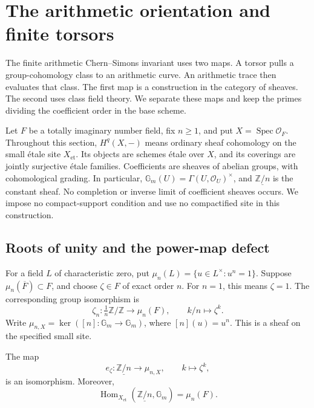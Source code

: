 \section{The arithmetic orientation and finite torsors}
\label{sec:do26-orientation}

The finite arithmetic Chern--Simons invariant uses two maps.  A torsor
pulls a group-cohomology class to an arithmetic curve.  An arithmetic trace
then evaluates that class.  The first map is a construction in the category
of sheaves.  The second uses class field theory.  We separate these maps
and keep the primes dividing the coefficient order in the base scheme.

Let \(F\) be a totally imaginary number field, fix \(n\geq1\),
and put \(X=\operatorname{Spec}\mathcal O_F\).  Throughout this section,
\(H^q(X,-)\) means ordinary sheaf cohomology on the small \'etale site
\(X_{\mathrm{et}}\).  Its objects are schemes \'etale over \(X\), and
its coverings are jointly surjective \'etale families.  Coefficients are
sheaves of abelian groups, with cohomological grading.  In particular,
\(\mathbb G_m(U)=\Gamma(U,\mathcal O_U)^\times\), and
\(\underline{\mathbb Z/n}\) is the constant sheaf.  No completion or
inverse limit of coefficient sheaves occurs.  We impose no compact-support
condition and use no compactified site in this construction.

\subsection{Roots of unity and the power-map defect}

For a field \(L\) of characteristic zero, put
\(\mu_n(L)=\{u\in L^\times:u^n=1\}\).
Suppose \(\mu_n(\overline F)\subset F\), and choose
\(\zeta\in F\) of exact order \(n\).  For \(n=1\), this means
\(\zeta=1\).  The corresponding group isomorphism is
\[
 \zeta_n:\tfrac1n\mathbb Z/\mathbb Z\longrightarrow\mu_n(F),
 \qquad k/n\longmapsto\zeta^k.
\]
Write \(\mu_{n,X}=\ker([n]:\mathbb G_m\to\mathbb G_m)\), where
\([n](u)=u^n\).  This is a sheaf on the specified small site.

\begin{lemma}
\label{lem:do26-roots}
The map
\[
 e_\zeta:\underline{\mathbb Z/n}\longrightarrow\mu_{n,X},
 \qquad k\longmapsto\zeta^k,
\]
is an isomorphism.  Moreover,
\[
 \operatorname{Hom}_{X_{\mathrm{et}}}
   (\underline{\mathbb Z/n},\mathbb G_m)=\mu_n(F).
\]
\end{lemma}

